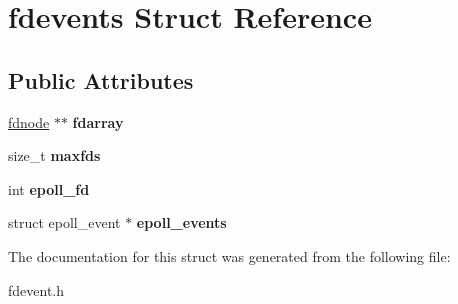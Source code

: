 \hypertarget{structfdevents}{
\section{fdevents Struct Reference}
\label{structfdevents}
}
\subsection*{Public Attributes}
\begin{DoxyCompactItemize}
\item 
\hypertarget{structfdevents_afaf0c3caf9df8add00421fc912e78ad1}{
\hyperlink{struct__fdnode}{fdnode} $\ast$$\ast$ {\bfseries fdarray}}
\label{structfdevents_afaf0c3caf9df8add00421fc912e78ad1}

\item 
\hypertarget{structfdevents_a02f9df92b0ad5e0c79c36fdb1bc8d0a5}{
size\_\-t {\bfseries maxfds}}
\label{structfdevents_a02f9df92b0ad5e0c79c36fdb1bc8d0a5}

\item 
\hypertarget{structfdevents_a3e64ade618662067a51ec39d1dbb4831}{
int {\bfseries epoll\_\-fd}}
\label{structfdevents_a3e64ade618662067a51ec39d1dbb4831}

\item 
\hypertarget{structfdevents_a4dd83974fd42e2ee470c250ebb5c7c9b}{
struct epoll\_\-event $\ast$ {\bfseries epoll\_\-events}}
\label{structfdevents_a4dd83974fd42e2ee470c250ebb5c7c9b}

\end{DoxyCompactItemize}


The documentation for this struct was generated from the following file:\begin{DoxyCompactItemize}
\item 
fdevent.h\end{DoxyCompactItemize}
